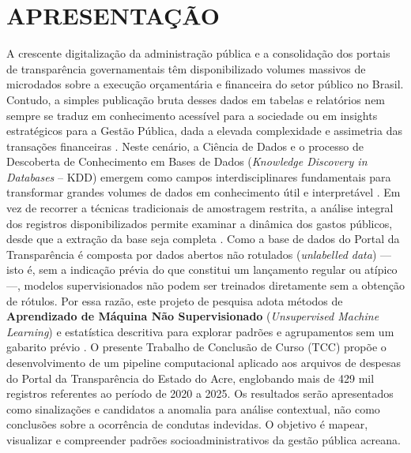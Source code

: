 \documentclass[
    12pt,               %
    openright,          %
    oneside,            %
    a4paper,            %
    chapter=TITLE,      %
    sumario=tradicional,%
    english,            %
    brazilian,          %
 ]{abntex2}
\begin{document}
\chapter{APRESENTAÇÃO}\label{sec:introducao}
A crescente digitalização da administração pública e a consolidação dos portais de transparência governamentais têm disponibilizado volumes massivos de microdados sobre a execução orçamentária e financeira do setor público no Brasil. Contudo, a simples publicação bruta desses dados em tabelas e relatórios nem sempre se traduz em conhecimento acessível para a sociedade ou em insights estratégicos para a Gestão Pública, dada a elevada complexidade e assimetria das transações financeiras \cite{cavalcanti2014, pereira2025}. Neste cenário, a Ciência de Dados e o processo de Descoberta de Conhecimento em Bases de Dados (\textit{Knowledge Discovery in Databases} -- KDD) emergem como campos interdisciplinares fundamentais para transformar grandes volumes de dados em conhecimento útil e interpretável \cite{goldschmidt2005}. Em vez de recorrer a técnicas tradicionais de amostragem restrita, a análise integral dos registros disponibilizados permite examinar a dinâmica dos gastos públicos, desde que a extração da base seja completa \cite{pereira2025}. Como a base de dados do Portal da Transparência é composta por dados abertos não rotulados (\textit{unlabelled data}) --- isto é, sem a indicação prévia do que constitui um lançamento regular ou atípico ---, modelos supervisionados não podem ser treinados diretamente sem a obtenção de rótulos. Por essa razão, este projeto de pesquisa adota métodos de \textbf{Aprendizado de Máquina Não Supervisionado} (\textit{Unsupervised Machine Learning}) e estatística descritiva para explorar padrões e agrupamentos sem um gabarito prévio \cite{nunes2021}. O presente Trabalho de Conclusão de Curso (TCC) propõe o desenvolvimento de um pipeline computacional aplicado aos arquivos de despesas do Portal da Transparência do Estado do Acre, englobando mais de 429 mil registros referentes ao período de 2020 a 2025. Os resultados serão apresentados como sinalizações e candidatos a anomalia para análise contextual, não como conclusões sobre a ocorrência de condutas indevidas. O objetivo é mapear, visualizar e compreender padrões socioadministrativos da gestão pública acreana.
\end{document}

